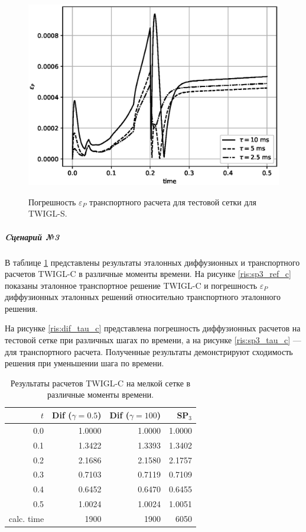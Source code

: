\documentclass{crm-article}
\begin{document}
\begin{figure}[ht]
\begin{center}
	\includegraphics[width=0.4\linewidth]{sp3_tau_r.eps}\\
	\caption{\label{image:canonsummary} Погрешность $\varepsilon_P$ транспортного расчета для тестовой сетки для TWIGL-S.}
	\label{ris:sp3_tau_r}
\end{center}
\end{figure}

\subparagraph{Cценарий №3}
В таблице \ref{table:twigl-c} представлены результаты эталонных диффузионных и транспортного расчетов TWIGL-C в различные моменты времени.
На рисунке \ref{ris:sp3_ref_c} показаны эталонное транспортное решение TWIGL-C и погрешность $\varepsilon_P$ диффузионных эталонных решений относительно транспортного эталонного решения. 

На рисунке \ref{ris:dif_tau_c} представлена погрешность диффузионных расчетов на тестовой сетке при различных шагах по времени, а на рисунке \ref{ris:sp3_tau_c} --- для транспортного расчета. Полученные результаты демонстрируют сходимость решения при уменьшении шага по времени.


\begin{table}[htp]
\caption{Результаты расчетов TWIGL-C на мелкой сетке в различные моменты времени.}
\label{table:twigl-c}
\begin{center}
\begin{tabular}{r r r r}
\hline
$t$ & Dif ($\gamma=0.5$) & Dif ($\gamma=100$) & SP$_3$\\
\hline
0.0 & 1.0000 & 1.0000 & 1.0000\\
0.1 & 1.3422  & 1.3393 & 1.3402\\
0.2 & 2.1686  & 2.1580 & 2.1757\\
0.3 & 0.7103  & 0.7119 & 0.7109\\
0.4 & 0.6452 & 0.6470 & 0.6455\\
0.5 & 1.0024  & 1.0024 & 1.0051\\
\hline
calc. time & 1900 & 1900 & 6050 \\
\end{tabular}
\end{center}
\end{table}
\end{document}

